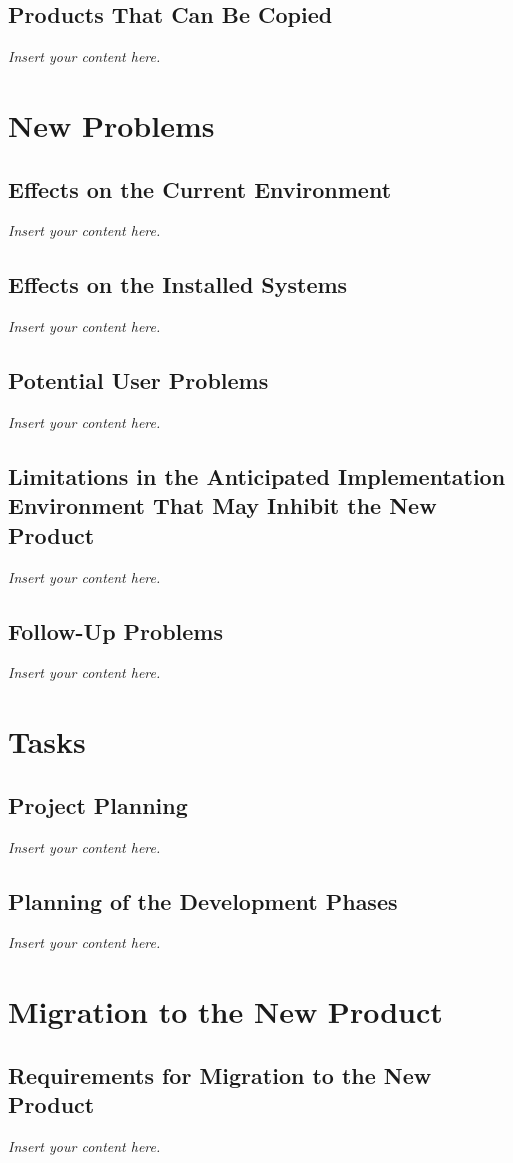 \documentclass[12pt]{article}
\newcommand{\lips}{\textit{Insert your content here.}}
\begin{document}
\subsection{Products That Can Be Copied}
\lips

\section{New Problems}
\subsection{Effects on the Current Environment}
\lips
\subsection{Effects on the Installed Systems}
\lips
\subsection{Potential User Problems}
\lips
\subsection{Limitations in the Anticipated Implementation Environment That May
Inhibit the New Product}
\lips
\subsection{Follow-Up Problems}
\lips

\section{Tasks}
\subsection{Project Planning}
\lips
\subsection{Planning of the Development Phases}
\lips

\section{Migration to the New Product}
\subsection{Requirements for Migration to the New Product}
\lips
\end{document}
